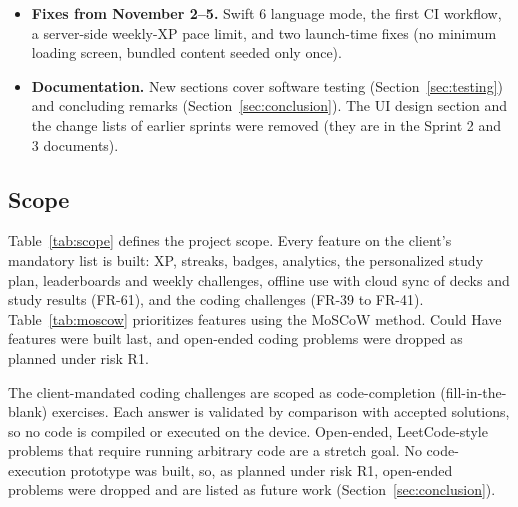\documentclass[12pt,letterpaper]{article}
\begin{document}
\begin{itemize}
        test accounts, and the peer usability study were dropped because they could
        not be verified within the sprint; R13 (client-reported weekly XP) was
        accepted with its rate limit (decisions S33, S34).
  \item \textbf{Fixes from November 2--5.} Swift 6 language mode, the first CI
        workflow, a server-side weekly-XP pace limit, and two launch-time fixes
        (no minimum loading screen, bundled content seeded only once).
  \item \textbf{Documentation.} New sections cover software testing
        (Section~\ref{sec:testing}) and concluding remarks
        (Section~\ref{sec:conclusion}). The UI design section and the change lists
        of earlier sprints were removed (they are in the Sprint 2 and 3 documents).
\end{itemize}

\subsection{Scope}
Table~\ref{tab:scope} defines the project scope. Every feature on the client's
mandatory list is built: XP, streaks, badges, analytics, the personalized study
plan, leaderboards and weekly challenges, offline use with cloud sync of decks and
study results (FR-61), and the coding challenges (FR-39 to FR-41). Table~\ref{tab:moscow}
prioritizes features using the MoSCoW method. Could Have features were built last,
and open-ended coding problems were dropped as planned under risk R1.

The client-mandated coding challenges are scoped as code-completion
(fill-in-the-blank) exercises. Each answer is validated by comparison with accepted
solutions, so no code is compiled or executed on the device. Open-ended,
LeetCode-style problems that require running arbitrary code are a stretch goal. No
code-execution prototype was built, so, as planned under risk R1, open-ended
problems were dropped and are listed as future work (Section~\ref{sec:conclusion}).
\end{document}

